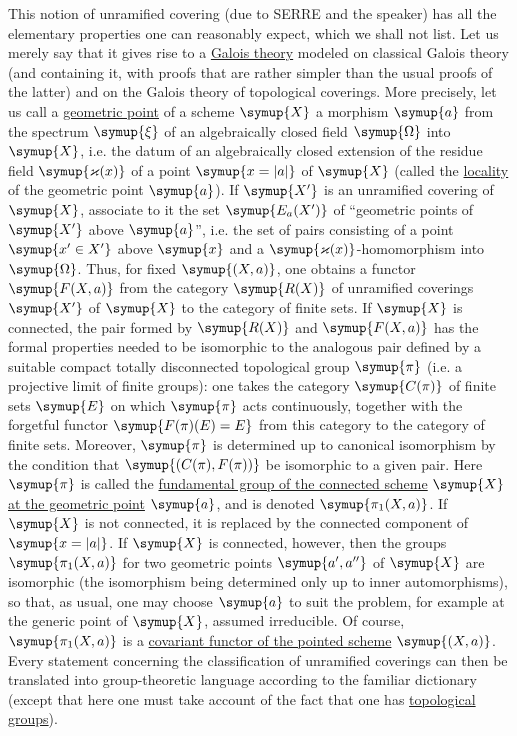 This notion of unramified covering (due to SERRE and the speaker) has all the
elementary properties one can reasonably expect, which we shall not list. Let
us merely say that it gives rise to a \uline{Galois theory} modeled on classical
Galois theory (and containing it, with proofs that are rather simpler than the
usual proofs of the latter) and on the Galois theory of topological coverings.
More precisely, let us call a \uline{geometric point} of a scheme $\symup{X}$ a morphism $\symup{a}$
from the spectrum $\symup{\xi}$ of an algebraically closed field $\symup{\Omega}$ into $\symup{X}$,
i.e. the datum of an algebraically closed extension of the residue field
$\symup{\varkappa(x)}$ of a point $\symup{x=|a|}$ of $\symup{X}$ (called the \uline{locality} of the
geometric point $\symup{a}$). If $\symup{X'}$ is an unramified covering of $\symup{X}$, associate to it
the set $\symup{E_a(X')}$ of “geometric points of $\symup{X'}$ above $\symup{a}$”, i.e. the set of
pairs consisting of a point $\symup{x'\in X'}$ above $\symup{x}$ and a
$\symup{\varkappa(x)}$-homomorphism into $\symup{\Omega}$. Thus, for fixed
$\symup{(X,a)}$, one obtains a functor $\symup{F(X,a)}$ from the category $\symup{R(X)}$ of unramified
coverings $\symup{X'}$ of $\symup{X}$ to the category of finite sets. If $\symup{X}$ is connected, the
pair formed by $\symup{R(X)}$ and $\symup{F(X,a)}$ has the formal properties needed to be
isomorphic to the analogous pair defined by a suitable compact totally
disconnected topological group $\symup{\pi}$ (i.e. a projective limit of finite groups):
one takes the category $\symup{C(\pi)}$ of finite sets $\symup{E}$ on which $\symup{\pi}$ acts
continuously, together with the forgetful functor $\symup{F(\pi)(E)=E}$ from this
category to the category of finite sets. Moreover, $\symup{\pi}$ is determined up to
canonical isomorphism by the condition that $\symup{(C(\pi),F(\pi))}$ be isomorphic to
a given pair. Here $\symup{\pi}$ is called the \uline{fundamental group of the
connected scheme} $\symup{X}$ \uline{at the geometric point} $\symup{a}$, and is denoted $\symup{\pi_1(X,a)}$.
If $\symup{X}$ is not connected, it is replaced by the connected component of
$\symup{x=|a|}$. If $\symup{X}$ is connected, however, then the groups $\symup{\pi_1(X,a)}$ for two
geometric points $\symup{a',a''}$ of $\symup{X}$ are isomorphic (the isomorphism being
determined only up to inner automorphisms), so that, as usual, one may choose
$\symup{a}$ to suit the problem, for example at the generic point of
$\symup{X}$, assumed irreducible. Of course, $\symup{\pi_1(X,a)}$ is a \uline{covariant functor of the
pointed scheme} $\symup{(X,a)}$. Every statement concerning the classification of
unramified coverings can
then be translated into group-theoretic language according to the familiar
dictionary (except that here one must take account of the fact that one has \uline{topological groups}).


